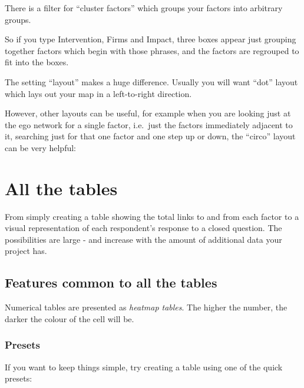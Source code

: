 \documentclass[
]{book}
\begin{document}
There is a filter for ``cluster factors'' which groups your factors into arbitrary groups.

So if you type Intervention, Firms and Impact, three boxes appear just grouping together factors which begin with those phrases, and the factors are regrouped to fit into the boxes.

The setting ``layout'' makes a huge difference. Usually you will want ``dot'' layout which lays out your map in a left-to-right direction.

However, other layouts can be useful, for example when you are looking just at the ego network for a single factor, i.e.~just the factors immediately adjacent to it, searching just for that one factor and one step up or down, the ``circo'' layout can be very helpful:

\hypertarget{all-the-tables}{%
\chapter{All the tables}\label{all-the-tables}}

From simply creating a table showing the total links to and from each factor to a visual representation of each respondent's response to a closed question. The possibilities are large - and increase with the amount of additional data your project has.

\hypertarget{features-common-to-all-the-tables}{%
\section{Features common to all the tables}\label{features-common-to-all-the-tables}}

Numerical tables are presented as \emph{heatmap tables}. The higher the number, the darker the colour of the cell will be.

\hypertarget{presets}{%
\subsection{Presets}\label{presets}}

If you want to keep things simple, try creating a table using one of the quick presets:
\end{document}
